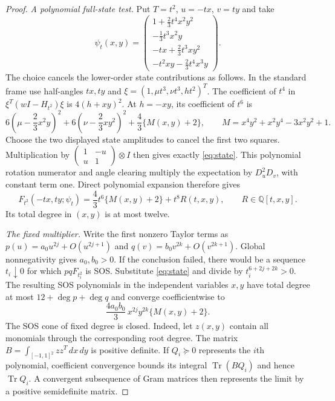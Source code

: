 \documentclass[11pt]{article}
\begin{document}
\begin{proof}
\emph{A polynomial full-state test.}
Put $T=t^2$, $u=-tx$, $v=ty$ and take
\begin{equation}
 \psi_t(x,y)=
 \begin{pmatrix}
 1+\frac23t^4x^2y^2\\
 -\frac13t^3x^2y\\
 -tx+\frac23t^3xy^2\\
 -t^2xy-\frac23t^4x^3y
 \end{pmatrix}.                                      \label{eq:state}
\end{equation}
The choice cancels the lower-order state contributions as follows.
In the standard frame use half-angles $tx,ty$ and
$\xi=(1,\mu t^3,\nu t^3,h t^2)^T$. The coefficient of $t^4$ in
$\xi^T(wI-H_{t^2})\xi$ is $4(h+xy)^2$. At $h=-xy$, its coefficient
of $t^6$ is
\[
 6\left(\mu-\frac23x^2y\right)^2
 +6\left(\nu-\frac23xy^2\right)^2
 +\frac43\{M(x,y)+2\},\qquad
 M=x^4y^2+x^2y^4-3x^2y^2+1.
\]
Choose the two displayed state amplitudes to cancel the first two squares.
Multiplication by
$\left(\begin{smallmatrix}1&-u\\u&1\end{smallmatrix}\right)\otimes I$
then gives exactly \eqref{eq:state}. This polynomial rotation numerator
and angle clearing multiply the expectation by $D_u^2D_v$, with constant
term one. Direct polynomial expansion therefore gives
\begin{equation}
 F_{t^2}(-tx,ty;\psi_t)
 =\frac43t^6\{M(x,y)+2\}+t^8R(t,x,y),
 \qquad R\in\mathbb Q[t,x,y].                        \label{eq:pullback}
\end{equation}
Its total degree in $(x,y)$ is at most twelve.

\emph{The fixed multiplier.}
Write the first nonzero Taylor terms as
$p(u)=a_0u^{2j}+O(u^{2j+1})$ and
$q(v)=b_0v^{2k}+O(v^{2k+1})$. Global nonnegativity gives
$a_0,b_0>0$. If the conclusion failed, there would be a sequence
$t_i\downarrow0$ for which $pqF_{t_i^2}$ is SOS. Substitute
\eqref{eq:state} and divide by $t_i^{6+2j+2k}>0$.
The resulting SOS polynomials in the independent variables $x,y$
have total degree at most $12+\deg p+\deg q$ and converge coefficientwise to
\begin{equation}
 \frac{4a_0b_0}{3}\,x^{2j}y^{2k}\{M(x,y)+2\}.          \label{eq:limit}
\end{equation}
The SOS cone of fixed degree is closed. Indeed, let $z(x,y)$ contain
all monomials through the corresponding root degree. The matrix
$B=\int_{[-1,1]^2}zz^T\,dx\,dy$ is positive definite.
If $Q_i\succeq0$ represents the $i$th polynomial, coefficient
convergence bounds its integral $\operatorname{Tr}(BQ_i)$ and hence
$\operatorname{Tr}Q_i$. A convergent subsequence of Gram matrices
then represents the limit by a positive semidefinite matrix.


\end{proof}
\end{document}
